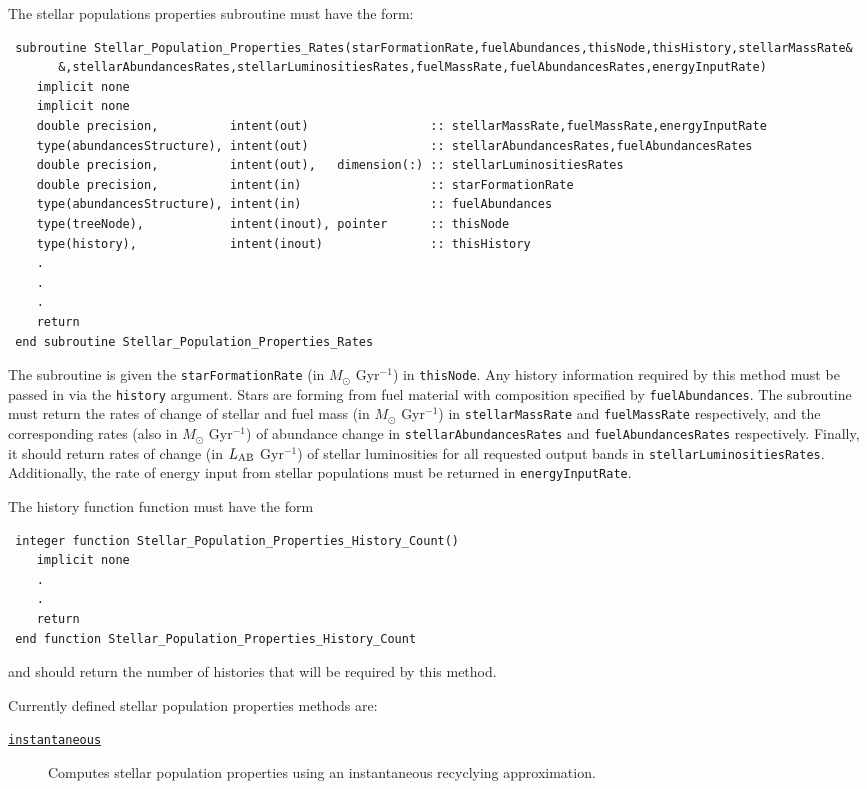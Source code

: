 The stellar populations properties subroutine must have the form:
\begin{verbatim}
 subroutine Stellar_Population_Properties_Rates(starFormationRate,fuelAbundances,thisNode,thisHistory,stellarMassRate&
       &,stellarAbundancesRates,stellarLuminositiesRates,fuelMassRate,fuelAbundancesRates,energyInputRate)
    implicit none
    implicit none
    double precision,          intent(out)                 :: stellarMassRate,fuelMassRate,energyInputRate
    type(abundancesStructure), intent(out)                 :: stellarAbundancesRates,fuelAbundancesRates
    double precision,          intent(out),   dimension(:) :: stellarLuminositiesRates
    double precision,          intent(in)                  :: starFormationRate
    type(abundancesStructure), intent(in)                  :: fuelAbundances
    type(treeNode),            intent(inout), pointer      :: thisNode
    type(history),             intent(inout)               :: thisHistory
    .
    .
    .
    return
 end subroutine Stellar_Population_Properties_Rates
\end{verbatim}
The subroutine is given the {\tt starFormationRate} (in $M_\odot$ Gyr$^{-1}$) in {\tt thisNode}. Any history information required by this method must be passed in via the {\tt history} argument. Stars are forming from fuel material with composition specified by {\tt fuelAbundances}. The subroutine must return the rates of change of stellar and fuel mass (in $M_\odot$ Gyr$^{-1}$) in {\tt stellarMassRate} and {\tt fuelMassRate} respectively, and the corresponding rates (also in $M_\odot$ Gyr$^{-1}$) of abundance change in {\tt stellarAbundancesRates} and {\tt fuelAbundancesRates} respectively. Finally, it should return rates of change (in $L_{\rm AB}$ Gyr$^{-1}$) of stellar luminosities for all requested output bands in {\tt stellarLuminositiesRates}. Additionally, the rate of energy input from stellar populations must be returned in {\tt energyInputRate}.

The history function function must have the form
\begin{verbatim}
 integer function Stellar_Population_Properties_History_Count()
    implicit none
    .
    .
    return
 end function Stellar_Population_Properties_History_Count
\end{verbatim}
and should return the number of histories that will be required by this method.

Currently defined stellar population properties methods are:
\begin{description}
 \item [\hyperlink{stellar_populations.properties.instantaneous.F90:stellar_population_properties_instantaneous:stellar_population_properties_rates_instantaneous}{{\tt instantaneous}}] Computes stellar population properties using an instantaneous recyclying approximation.
\end{description}

